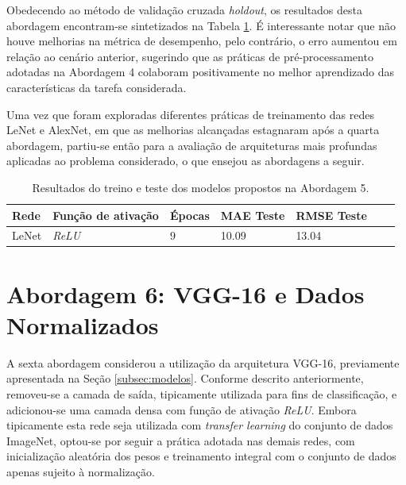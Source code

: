 	Obedecendo ao método de validação cruzada \emph{holdout}, os resultados desta abordagem encontram-se sintetizados na Tabela \ref{tab:results-5}. É interessante notar que não houve melhorias na métrica de desempenho, pelo contrário, o erro aumentou em relação ao cenário anterior, sugerindo que as práticas de pré-processamento adotadas na Abordagem 4 colaboram positivamente no melhor aprendizado das características da tarefa considerada.

	Uma vez que foram exploradas diferentes práticas de treinamento das redes LeNet e AlexNet, em que as melhorias alcançadas estagnaram após a quarta abordagem, partiu-se então para a avaliação de arquiteturas mais profundas aplicadas ao problema considerado, o que ensejou as abordagens a seguir.

	\begin{table}[!ht]
		\centering
		\caption{Resultados do treino e teste dos modelos propostos na Abordagem 5.}
		\label{tab:results-5}
			\begin{tabular}{l l l l l l l}
				\toprule
				Rede & Função de ativação & Épocas & MAE Teste & RMSE Teste \\
				\midrule
				LeNet & \emph{ReLU} & 9 &  10.09 & 13.04 \\
				\bottomrule
			\end{tabular}
		\end{table}


\section{Abordagem 6: VGG-16 e Dados Normalizados}
	A sexta abordagem considerou a utilização da arquitetura VGG-16, previamente apresentada na Seção \ref{subsec:modelos}. Conforme descrito anteriormente, removeu-se a camada de saída, tipicamente utilizada para fins de classificação, e adicionou-se uma camada densa com função de ativação \emph{ReLU}. Embora tipicamente esta rede seja utilizada com \emph{transfer learning} do conjunto de dados ImageNet, optou-se por seguir a prática adotada nas demais redes, com inicialização aleatória dos pesos e treinamento integral com o conjunto de dados apenas sujeito à normalização.

